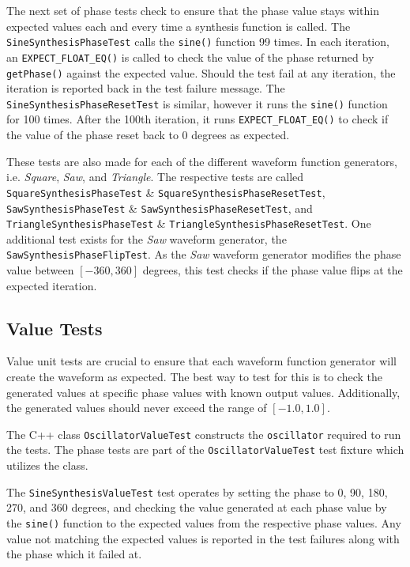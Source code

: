 \documentclass[a4paper,12pt]{report}
\begin{document}
The next set of phase tests check to ensure that the phase value stays within expected values each and every time a synthesis function is called. The \texttt{SineSynthesisPhaseTest} calls the \texttt{sine()} function 99 times. In each iteration, an \texttt{EXPECT\_FLOAT\_EQ()} is called to check the value of the phase returned by \texttt{getPhase()} against the expected value. Should the test fail at any iteration, the iteration is reported back in the test failure message. The \texttt{SineSynthesisPhaseResetTest} is similar, however it runs the \texttt{sine()} function for 100 times. After the 100th iteration, it runs \texttt{EXPECT\_FLOAT\_EQ()} to check if the value of the phase reset back to 0 degrees as expected.

These tests are also made for each of the different waveform function generators, i.e. \emph{Square}, \emph{Saw}, and \emph{Triangle}. The respective tests are called \texttt{SquareSynthesisPhaseTest} \& \texttt{SquareSynthesisPhaseResetTest}, \texttt{SawSynthesisPhaseTest} \& \texttt{SawSynthesisPhaseResetTest}, and \texttt{TriangleSynthesisPhaseTest} \& \texttt{TriangleSynthesisPhaseResetTest}. One additional test exists for the \emph{Saw} waveform generator, the \texttt{SawSynthesisPhaseFlipTest}. As the \emph{Saw} waveform generator modifies the phase value between $[-360,360]$ degrees, this test checks if the phase value flips at the expected iteration.

\subsection{Value Tests}
\label{subsec:valuetests}
Value unit tests are crucial to ensure that each waveform function generator will create the waveform as expected. The best way to test for this is to check the generated values at specific phase values with known output values. Additionally, the generated values should never exceed the range of $[-1.0,1.0]$.

The C++ class \texttt{OscillatorValueTest} constructs the \texttt{oscillator} required to run the tests. The phase tests are part of the \texttt{OscillatorValueTest} test fixture which utilizes the class.

The \texttt{SineSynthesisValueTest} test operates by setting the phase to 0, 90, 180, 270, and 360 degrees, and checking the value generated at each phase value by the \texttt{sine()} function to the expected values from the respective phase values. Any value not matching the expected values is reported in the test failures along with the phase which it failed at.
\end{document}
